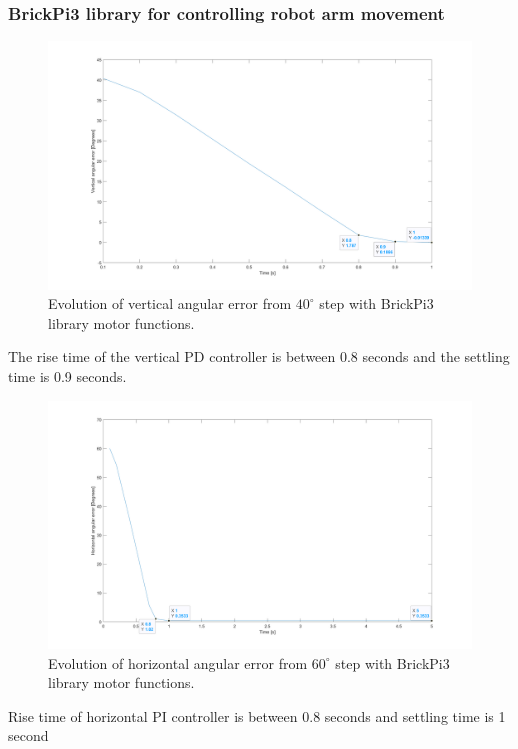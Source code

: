 \subsubsection{BrickPi3 library for controlling robot arm movement}
\begin{figure}[H]
\centering
\includegraphics[width=\textwidth]{assets/Vertical_built_in_functions.png}
\caption{Evolution of vertical angular error from \(40^{\circ}\) step with BrickPi3 library motor functions.}
\label{vert_P}
\end{figure}
The rise time of the vertical PD controller is between 0.8 seconds and the settling time is 0.9 seconds.
\begin{figure}[H]
\centering
\includegraphics[width=\textwidth]{assets/Horizontal_built_in_funtion.png}
\caption{Evolution of horizontal angular error from \(60^{\circ}\) step with BrickPi3 library motor functions.}
\label{vert_P}
\end{figure}
Rise time of horizontal PI controller is between 0.8 seconds and settling time is 1 second

